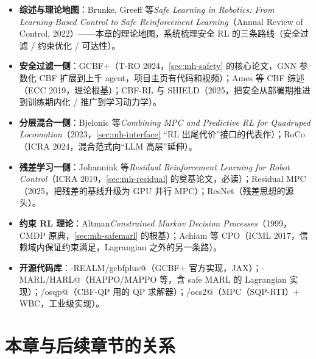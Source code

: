 \begin{itemize}
  \item \textbf{综述与理论地图}：Brunke, Greeff 等\emph{Safe Learning in Robotics: From Learning-Based Control to Safe Reinforcement Learning}（Annual Review of Control, 2022\cite{brunke2022safe}）——本章的理论地图，系统梳理安全 RL 的三条路线（安全过滤 / 约束优化 / 可达性）。
  \item \textbf{安全过滤一侧}：GCBF+\cite{zhang2025gcbfplus}（T-RO 2024，\cref{sec:mh-safety} 的核心论文，GNN 参数化 CBF 扩展到上千 agent，项目主页有代码和视频）；Ames 等 CBF 综述\cite{ames2019cbf}（ECC 2019，理论根基）；CBF-RL\cite{gandhi2023shield} 与 SHIELD\cite{yin2023shield}（2025，把安全从部署期推进到训练期内化 / 推广到学习动力学）。
  \item \textbf{分层混合一侧}：Bjelonic 等\emph{Combining MPC and Predictive RL for Quadruped Locomotion}\cite{bjelonic2023mpcrl}（2023，\cref{sec:mh-interface} “RL 出尾代价”接口的代表作）；RoCo\cite{mandi2024roco}（ICRA 2024，混合范式向“LLM 高层”延伸）。
  \item \textbf{残差学习一侧}：Johannink 等\emph{Residual Reinforcement Learning for Robot Control}\cite{johannink2019residual}（ICRA 2019，\cref{sec:mh-residual} 的奠基论文，必读）；Residual MPC\cite{residualmpc2025}（2025，把残差的基线升级为 GPU 并行 MPC）；ResNet\cite{he2016resnet}（残差思想的源头）。
  \item \textbf{约束 RL 理论}：Altman\emph{Constrained Markov Decision Processes}\cite{altman1999cmdp}（1999，CMDP 原典，\cref{sec:mh-safemarl} 的根基）；Achiam 等 CPO\cite{achiam2017constrained}（ICML 2017，信赖域内保证约束满足，Lagrangian 之外的另一条路）。
  \item \textbf{开源代码库}：\verb@MIT-REALM/gcbfplus@（GCBF+ 官方实现，JAX）；\verb@PKU-MARL/HARL@（HAPPO/MAPPO 等，含 safe MARL 的 Lagrangian 实现）；\verb@osqp/osqp@（CBF-QP 用的 QP 求解器）；\verb@leggedrobotics/ocs2@（MPC（SQP-RTI）$+$ WBC，工业级实现）。
\end{itemize}

\section*{本章与后续章节的关系}

